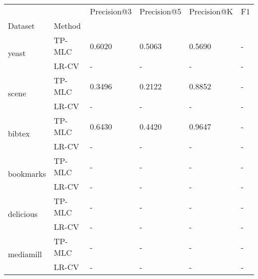 \begin{tabular}{llllll}
\toprule
       &       & Precision@3 & Precision@5 & Precision@K & F1 \\
Dataset & Method &             &             &             &    \\
\midrule
\multirow{2}{*}{yeast} & TP-MLC &      0.6020 &      0.5063 &      0.5690 &  - \\
       & LR-CV &           - &           - &           - &  - \\
\cline{1-6}
\multirow{2}{*}{scene} & TP-MLC &      0.3496 &      0.2122 &      0.8852 &  - \\
       & LR-CV &           - &           - &           - &  - \\
\cline{1-6}
\multirow{2}{*}{bibtex} & TP-MLC &      0.6430 &      0.4420 &      0.9647 &  - \\
       & LR-CV &           - &           - &           - &  - \\
\cline{1-6}
\multirow{2}{*}{bookmarks} & TP-MLC &           - &           - &           - &  - \\
       & LR-CV &           - &           - &           - &  - \\
\cline{1-6}
\multirow{2}{*}{delicious} & TP-MLC &           - &           - &           - &  - \\
       & LR-CV &           - &           - &           - &  - \\
\cline{1-6}
\multirow{2}{*}{mediamill} & TP-MLC &           - &           - &           - &  - \\
       & LR-CV &           - &           - &           - &  - \\
\bottomrule
\end{tabular}

